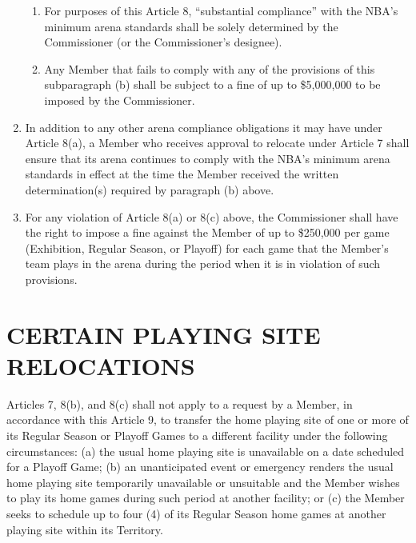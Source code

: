 \documentclass[]{book}
\begin{document}
\begin{enumerate}
\begin{enumerate}
  \item
    For purposes of this Article 8, ``substantial compliance'' with the NBA's minimum arena standards shall be solely determined by the Commissioner (or the Commissioner's designee).
  \item
    Any Member that fails to comply with any of the provisions of this subparagraph (b) shall be subject to a fine of up to \$5,000,000 to be imposed by the Commissioner.
  \end{enumerate}
\item
  In addition to any other arena compliance obligations it may have under Article 8(a), a Member who receives approval to relocate under Article 7 shall ensure that its arena continues to comply with the NBA's minimum arena standards in effect at the time the Member received the written determination(s) required by paragraph (b) above.
\item
  For any violation of Article 8(a) or 8(c) above, the Commissioner shall have the right to impose a fine against the Member of up to \$250,000 per game (Exhibition, Regular Season, or Playoff) for each game that the Member's team plays in the arena during the period when it is in violation of such provisions.
\end{enumerate}

\hypertarget{certain-playing-site-relocations}{%
\section{CERTAIN PLAYING SITE RELOCATIONS}\label{certain-playing-site-relocations}}

Articles 7, 8(b), and 8(c) shall not apply to a request by a Member, in accordance with this Article 9, to transfer the home playing site of one or more of its Regular Season or Playoff Games to a different facility under the following circumstances:
(a) the usual home playing site is unavailable on a date scheduled for a Playoff Game;
(b) an unanticipated event or emergency renders the usual home playing site temporarily unavailable or unsuitable and the Member wishes to play its home games during such period at another facility; or
(c) the Member seeks to schedule up to four (4) of its Regular Season home games at another playing site within its Territory.
\end{document}
